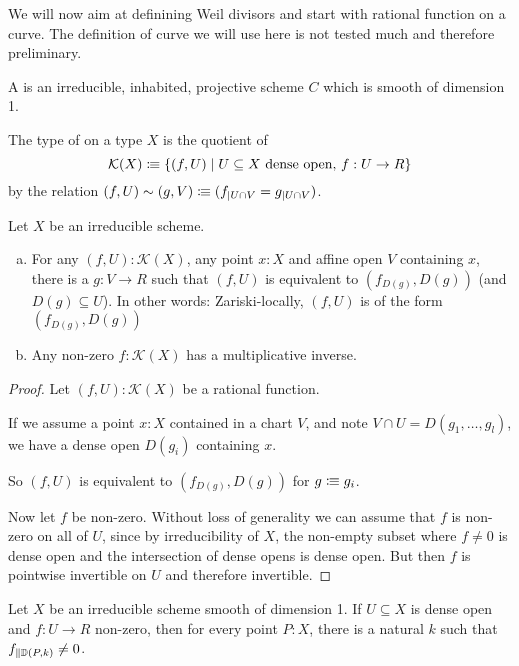 We will now aim at definining Weil divisors and start with rational function on a curve.
The definition of curve we will use here is not tested much and therefore preliminary.

\begin{definition}
  A  is an irreducible, inhabited, projective scheme $C$ which is smooth of dimension 1.
\end{definition}

\begin{definition}
  The type of  on a type $X$ is the quotient of
  \[
  \mathcal K(X)\vcentcolon\mspace{-1.2mu}\equiv \{(f,U)\mid U\subseteq X\text{  dense open, } f:U\to R \}
  \]
  by the relation $(f,U) \sim (g,V) \vcentcolon\mspace{-1.2mu}\equiv (f_{\mid U\cap V}=g_{\mid U\cap V})$.
\end{definition}

\begin{lemma}
  Let $X$ be an irreducible scheme.
  \begin{enumerate}[(a)]
  \item For any $(f,U):\mathcal K(X)$, any point $x:X$ and affine open $V$ containing $x$,
    there is a $g:V\to R$ such that $(f,U)$ is equivalent to $(f_{D(g)},D(g))$ (and $D(g)\subseteq U$).
    In other words: Zariski-locally, $(f,U)$ is of the form $(f_{D(g)},D(g))$
  \item Any non-zero $f:\mathcal K(X)$ has a multiplicative inverse.
  \end{enumerate}
\end{lemma}

\begin{proof}
  Let  $(f,U):\mathcal K(X)$ be a rational function.

  If we assume a point $x:X$ contained in a chart $V$,
  and note $V\cap U = D(g_1,\dots,g_l)$,
  we have a dense open $D(g_i)$ containing $x$.

  So $(f,U)$ is equivalent to $(f_{D(g)},D(g))$ for $g\vcentcolon\mspace{-1.2mu}\equiv g_i$.

  Now let $f$ be non-zero.
  Without loss of generality we can assume that $f$ is non-zero on all of $U$,
  since by irreducibility of $X$, the non-empty subset where $f \neq 0$ is dense open
  and the intersection of dense opens is dense open.
  But then $f$ is pointwise invertible on $U$ and therefore invertible.
\end{proof}

\begin{lemma}
  \label{order-is-bounded}
  Let $X$ be an irreducible scheme smooth of dimension 1.
  If $U\subseteq X$ is dense open and $f:U\to R$ non-zero,
  then for every point $P:X$, there is a natural $k$ such that $f_{\|\mathbb{D}(P,k)}\neq 0$.
\end{lemma}

